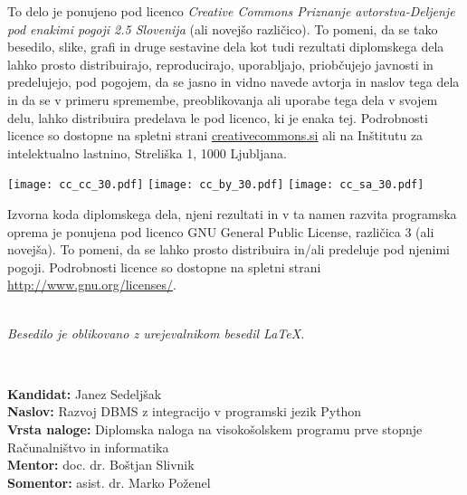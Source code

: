 \documentclass[a4paper,12pt,openright]{book}
\newcommand{\ttitle}{Razvoj DBMS z integracijo v programski jezik Python}
\newcommand{\clearemptydoublepage}{\newpage{\pagestyle{empty}\cleardoublepage}}
\newcommand{\CcImageCc}[1]{%
	\texttt{[image: cc\_cc\_30.pdf]}%
}
\newcommand{\CcImageBy}[1]{%
	\texttt{[image: cc\_by\_30.pdf]}%
}
\newcommand{\CcImageSa}[1]{%
	\texttt{[image: cc\_sa\_30.pdf]}%
}
\begin{document}
\newpage
\thispagestyle{empty}

\vspace*{5cm}
{\small \noindent
To delo je ponujeno pod licenco \textit{Creative Commons Priznanje avtorstva-Deljenje pod enakimi pogoji 2.5 Slovenija} (ali novej\v so razli\v cico).
To pomeni, da se tako besedilo, slike, grafi in druge sestavine dela kot tudi rezultati diplomskega dela lahko prosto distribuirajo,
reproducirajo, uporabljajo, priobčujejo javnosti in predelujejo, pod pogojem, da se jasno in vidno navede avtorja in naslov tega
dela in da se v primeru spremembe, preoblikovanja ali uporabe tega dela v svojem delu, lahko distribuira predelava le pod
licenco, ki je enaka tej.
Podrobnosti licence so dostopne na spletni strani \href{http://creativecommons.si}{creativecommons.si} ali na Inštitutu za
intelektualno lastnino, Streliška 1, 1000 Ljubljana.

\vspace*{1cm}
\begin{center}%
\CcImageCc{0.741573033707865}\hspace*{1ex}\CcImageBy{1}\hspace*{1ex}\CcImageSa{1}%
\end{center}
}

\vspace*{1cm}
{\small \noindent
Izvorna koda diplomskega dela, njeni rezultati in v ta namen razvita programska oprema je ponujena pod licenco GNU General Public License,
različica 3 (ali novejša). To pomeni, da se lahko prosto distribuira in/ali predeluje pod njenimi pogoji.
Podrobnosti licence so dostopne na spletni strani \url{http://www.gnu.org/licenses/}.
}

\vfill
\begin{center} 
\ \\ \vfill
{\em
Besedilo je oblikovano z urejevalnikom besedil \LaTeX.}
\end{center}

\clearemptydoublepage

\thispagestyle{empty}
\
\vfill

\bigskip
\noindent\textbf{Kandidat:} Janez Sedeljšak\\
\noindent\textbf{Naslov:} \ttitle \\
\noindent\textbf{Vrsta naloge:} Diplomska naloga na visokošolskem programu prve stopnje Računalništvo in informatika \\
\noindent\textbf{Mentor:} doc. dr. Boštjan Slivnik\\
\noindent\textbf{Somentor:} asist. dr. Marko Poženel\\
\end{document}
